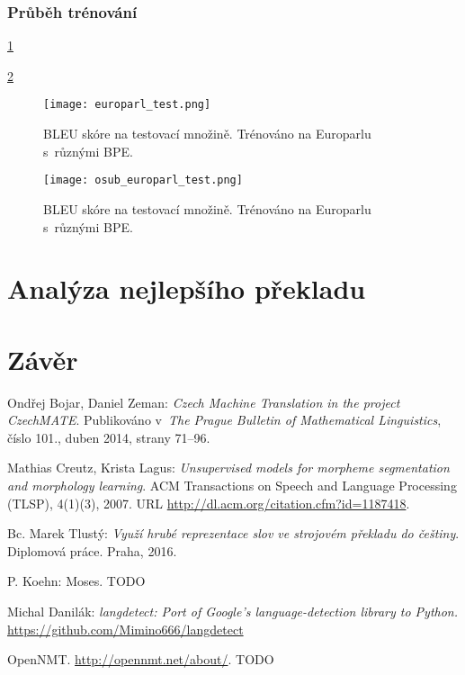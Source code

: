\documentclass[a4]{article}
\begin{document}


\subsubsection{Průběh trénování}

\ref{fig:europarl}

\ref{fig:osub}

\begin{figure}[h]
\centering
  \texttt{[image: europarl\_test.png]}
    \caption{BLEU skóre na testovací množině. Trénováno na Europarlu
	s~různými BPE.}
  \label{fig:europarl}
\end{figure}


\begin{figure}[h]
\centering
  \texttt{[image: osub\_europarl\_test.png]}
    \caption{BLEU skóre na testovací množině. Trénováno na Europarlu
	s~různými BPE.}
  \label{fig:osub}
\end{figure}



\section{Analýza nejlepšího překladu}

\section{Závěr}


\begin{thebibliography}{99}



 Ondřej Bojar, Daniel Zeman: {\sl Czech Machine Translation in the project
 CzechMATE}. Publikováno v~{\sl The Prague Bulletin of Mathematical
 Linguistics}, číslo 101., duben 2014, strany 71–96.

	Mathias Creutz, Krista Lagus: {\sl Unsupervised models for morpheme
	segmentation and
	morphology learning}. ACM Transactions on Speech and Language Processing
	(TLSP), 4(1)(3),
	2007. URL \url{http://dl.acm.org/citation.cfm?id=1187418}.

 Bc. Marek Tlustý: {\sl  Využí hrubé reprezentace slov ve strojovém
překladu do češtiny}. Diplomová práce. Praha, 2016.

 P. Koehn: Moses. TODO 



 Michal Danilák: {\sl langdetect: Port of Google's language-detection library to
 Python.}
 \url{https://github.com/Mimino666/langdetect}

 OpenNMT. \url{http://opennmt.net/about/}. TODO





\end{thebibliography}
\end{document}

